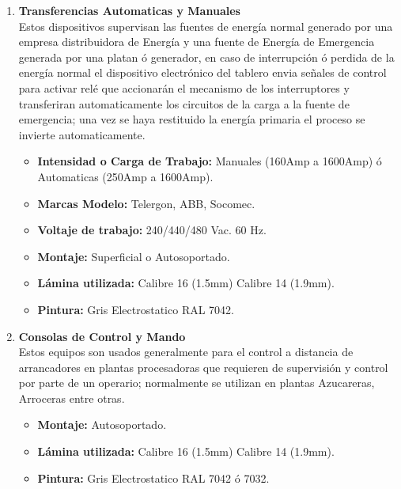 \documentclass[11pt,letterpaper]{article}
\begin{document}
\begin{enumerate}
	\item \textbf{Transferencias Automaticas y Manuales}\\
		Estos dispositivos supervisan las fuentes de energía normal generado por una empresa distribuidora de Energía y una fuente de Energía de Emergencia generada por una platan ó generador, en caso de interrupción ó perdida de la energía normal el dispositivo electrónico del tablero envia señales de control para activar relé que accionarán el mecanismo de los interruptores y transferiran automaticamente los circuitos de la carga a la fuente de emergencia; una vez se haya restituido la energía primaria el proceso se invierte automaticamente.
		\begin{itemize}
			\item \textbf{Intensidad o Carga de Trabajo:} Manuales (160Amp a 1600Amp) ó Automaticas (250Amp a 1600Amp).
			\item \textbf{Marcas Modelo:} Telergon, ABB, Socomec.
			\item \textbf{Voltaje de trabajo:} 240/440/480 Vac. 60 Hz.
			\item \textbf{Montaje:} Superficial o Autosoportado.
			\item \textbf{Lámina utilizada:} Calibre 16 (1.5mm) Calibre 14 (1.9mm).
			\item \textbf{Pintura:} Gris Electrostatico RAL 7042.
		\end{itemize}
	\item \textbf{Consolas de Control y Mando}\\
		Estos equipos son usados generalmente para el control a distancia de arrancadores en plantas procesadoras que requieren de supervisión y control por parte de un operario; normalmente se utilizan en plantas Azucareras, Arroceras entre otras.
		\begin{itemize}
			\item \textbf{Montaje:} Autosoportado.
			\item \textbf{Lámina utilizada:} Calibre 16 (1.5mm) Calibre 14 (1.9mm).
			\item \textbf{Pintura:} Gris Electrostatico RAL 7042 ó 7032.
		\end{itemize}
	

\end{enumerate}
\end{document}
